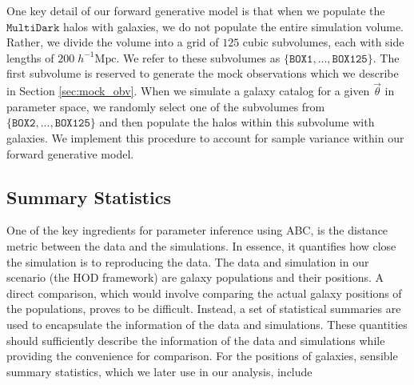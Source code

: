 \documentclass[fleqn,usenatbib]{mnras}
\newcommand{\pars}{\vec{\theta}}
\begin{document}
One key detail of our forward generative model is that when we populate the $\mathtt{MultiDark}$ halos 
with galaxies, we do not populate the entire simulation volume. Rather, we divide the volume into a 
grid of $125$ cubic subvolumes, each with side lengths of $200\;h^{-1}\mathrm{Mpc}$. We refer to these 
subvolumes as $\{\mathtt{BOX1}, ..., \mathtt{BOX125}\}$. 
The first subvolume is reserved to generate the mock observations which we describe in Section 
\ref{sec:mock_obv}. When we simulate a galaxy catalog for a given $\pars$ in parameter space, 
we randomly select one of the subvolumes from $\{\mathtt{BOX2}, ..., \mathtt{BOX125}\}$ and then 
populate the halos within this subvolume with galaxies. 
We implement this procedure to account for sample variance within our forward generative model. 

\subsection{Summary Statistics}\label{sec:statistics}
One of the key ingredients for parameter inference using ABC, is the distance metric between 
the data and the simulations. In essence, it quantifies how close the simulation 
is to reproducing the data. The data and simulation in our scenario (the HOD framework) 
are galaxy populations and their positions. A direct comparison, which would involve comparing 
the actual galaxy positions of the populations, proves to be difficult. 
Instead, a set of statistical summaries are used to encapsulate the information of the data 
and simulations. These quantities should sufficiently describe the information of the data
and simulations while providing the convenience for comparison. 
For the positions of galaxies, sensible summary statistics, 
which we later use in our analysis, include
\end{document}
